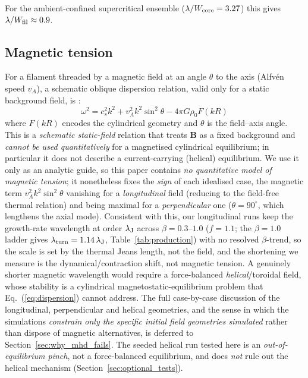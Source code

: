 \documentclass[usenatbib,twoside,twocolumn]{mnras}
\begin{document}
For the ambient-confined supercritical ensemble ($\lambda/W_{\rm core}=3.27$) this gives $\lambda/W_{\rm fil}\approx0.9$.

\subsection{Magnetic tension}
\label{sec:magnetic}

For a filament threaded by a magnetic field at an angle $\theta$ to the axis (Alfv\'en speed $v_A$), a schematic oblique dispersion relation, valid only for a static background field, is \citep{Nakamura1993}:
\begin{equation}
\omega^2 = c_s^2 k^2 + v_A^2 k^2 \sin^2\theta - 4\pi G\rho_0 F(kR)
\label{eq:dispersion}
\end{equation}
where $F(kR)$ encodes the cylindrical geometry and $\theta$ is the field--axis angle. This is a \emph{schematic static-field} relation that treats $\mathbf{B}$ as a fixed background and \emph{cannot be used quantitatively} for a magnetised cylindrical equilibrium; in particular it does not describe a current-carrying (helical) equilibrium. We use it only as an analytic guide, so this paper contains \emph{no quantitative model of magnetic tension}; it nonetheless fixes the \emph{sign} of each idealised case, the magnetic term $v_A^2k^2\sin^2\theta$ vanishing for a \emph{longitudinal} field (reducing to the field-free thermal relation) and being maximal for a \emph{perpendicular} one ($\theta=90^\circ$, which lengthens the axial mode). Consistent with this, our longitudinal runs keep the growth-rate wavelength at order $\lambda_{\rm J}$ across $\beta=0.3$--$1.0$ ($f=1.1$; the $\beta=1.0$ ladder gives $\lambda_{\rm turn}=1.14\,\lambda_{\rm J}$, Table~\ref{tab:production}) with no resolved $\beta$-trend, so the scale is set by the thermal Jeans length, not the field, and the shortening we measure is the dynamical/contraction shift, not magnetic tension. A genuinely shorter magnetic wavelength would require a force-balanced \emph{helical}/toroidal field, whose stability is a cylindrical magnetostatic-equilibrium problem that Eq.~(\ref{eq:dispersion}) cannot address. The full case-by-case discussion of the longitudinal, perpendicular and helical geometries, and the sense in which the simulations \emph{constrain only the specific initial field geometries simulated} rather than dispose of magnetic alternatives, is deferred to Section~\ref{sec:why_mhd_fails}. The seeded helical run tested here is an \emph{out-of-equilibrium pinch}, not a force-balanced equilibrium, and does \emph{not} rule out the helical mechanism (Section~\ref{sec:optional_tests}).
\end{document}
